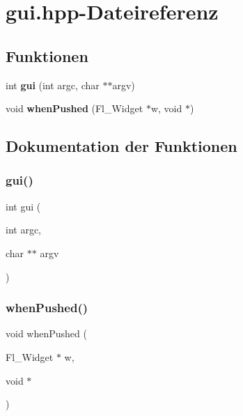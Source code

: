 \section{gui.\+hpp-\/\+Dateireferenz}
\label{gui_8hpp}
\subsection*{Funktionen}
\begin{DoxyCompactItemize}
\item 
int \textbf{ gui} (int argc, char $\ast$$\ast$argv)
\item 
void \textbf{ when\+Pushed} (Fl\+\_\+\+Widget $\ast$w, void $\ast$)
\end{DoxyCompactItemize}


\subsection{Dokumentation der Funktionen}
\mbox{\label{gui_8hpp_ace0698412b74cdbc0571809a0d903b49}} 
\subsubsection{gui()}
{\footnotesize\ttfamily int gui (\begin{DoxyParamCaption}\item[{int}]{argc,  }\item[{char $\ast$$\ast$}]{argv }\end{DoxyParamCaption})}

\mbox{\label{gui_8hpp_aa0976691d9932853389991b8459ebd85}} 
\subsubsection{when\+Pushed()}
{\footnotesize\ttfamily void when\+Pushed (\begin{DoxyParamCaption}\item[{Fl\+\_\+\+Widget $\ast$}]{w,  }\item[{void $\ast$}]{ }\end{DoxyParamCaption})}

